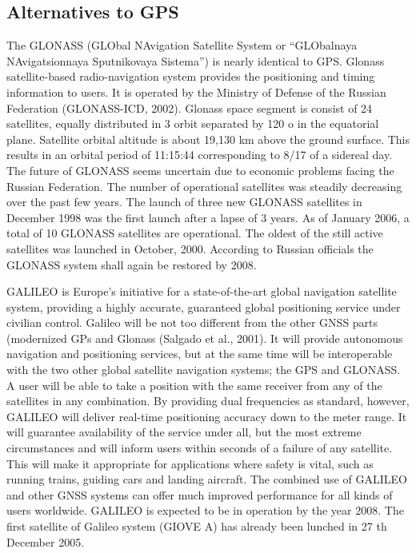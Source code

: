 \subsection{Alternatives to GPS}
The GLONASS (GLObal NAvigation Satellite System or “GLObalnaya NAvigatsionnaya
Sputnikovaya Sistema”) is nearly identical to GPS. Glonass satellite-based radio-navigation
system provides the positioning and timing information to users. It is operated by the Ministry of
Defense of the Russian Federation (GLONASS-ICD, 2002).
Glonass space segment is consist of 24 satellites, equally distributed in 3 orbit separated by 120 o
in the equatorial plane. Satellite orbital altitude is about 19,130 km above the ground surface.
This results in an orbital period of 11:15:44 corresponding to 8/17 of a sidereal day.
The future of GLONASS seems uncertain due to economic problems facing the Russian
Federation. The number of operational satellites was steadily decreasing over the past few years.
The launch of three new GLONASS satellites in December 1998 was the first launch after a
lapse of 3 years.
As of January 2006, a total of 10 GLONASS satellites are operational. The oldest of the still
active satellites was launched in October, 2000. According to Russian officials the GLONASS
system shall again be restored by 2008.

GALILEO is Europe’s initiative for a state-of-the-art global navigation satellite system,
providing a highly accurate, guaranteed global positioning service under civilian control. Galileo
will be not too different from the other GNSS parts (modernized GPs and Glonass (Salgado et
al., 2001). It will provide autonomous navigation and positioning services, but at the same time
will be interoperable with the two other global satellite navigation systems; the GPS and
GLONASS. A user will be able to take a position with the same receiver from any of the
satellites in any combination. By providing dual frequencies as standard, however, GALILEO
will deliver real-time positioning accuracy down to the meter range. It will guarantee availability
of the service under all, but the most extreme circumstances and will inform users within seconds
of a failure of any satellite. This will make it appropriate for applications where safety is vital,
such as running trains, guiding cars and landing aircraft. The combined use of GALILEO and
other GNSS systems can offer much improved performance for all kinds of users worldwide.
GALILEO is expected to be in operation by the year 2008. The first satellite of Galileo system
(GIOVE A) has already been lunched in 27 th December 2005.

